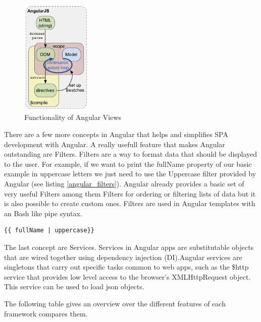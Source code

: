 \begin{figure}
	\centering	
	\includegraphics[width=0.3\textwidth]{./img/angular_view_2.png}
	\caption{Functionality of Angular Views}
	\label{fig:angular_views_2}
\end{figure} 

There are a few more concepts in Angular that helps and simplifies SPA development with Angular. A really usefull feature that makes Angular outstanding are Filters.
Filters are a way to format data that should be displayed to the user. For example, if we want to print the fullName property of our basic example in uppercase letters we just need to use the Uppercase filter provided by Angular (see listing \ref{angular_filters}). Angular already provides a basic set of very useful Filters among them Filters for ordering or filtering lists of data but it is also possible to create custom ones. Filters are used in Angular templates with an Bash like pipe syntax.

\begin{lstlisting}[label=angular_filters,caption=Angular Filters]
 {{ fullName | uppercase}}
\end{lstlisting}

The last concept are Services. Services in Angular apps are substitutable objects that are wired together using dependency injection (DI).Angular services are singletons that carry out specific tasks common to web apps, such as the \$http service that provides low level access to the browser's XMLHttpRequest object. This service can be used to load json objects.




The following table gives an overview over the different features of each framework compares them.




